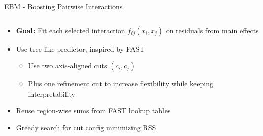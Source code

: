 \documentclass[10pt,compress,t,notes=noshow, xcolor=table]{beamer}
\begin{document}
\begin{frame}{EBM - Boosting Pairwise Interactions}
\begin{columns}[c, totalwidth=\textwidth]
    \begin{column}{0.7\textwidth}
        \begin{itemize}
            \item \textbf{Goal:} Fit each selected interaction $f_{ij}(x_i, x_j)$ on residuals from main effects
            \item Use tree-like predictor, inspired by FAST
            \begin{itemize}
                \item Use two axis-aligned cuts $(c_i, c_j)$ 
                \item Plus one refinement cut to increase flexibility while keeping interpretability
            \end{itemize}
            \item Reuse region-wise sums from FAST lookup tables
            \item Greedy search for cut config minimizing RSS
        \end{itemize}
    \end{column}
\end{columns}
\end{frame}



\end{document}

